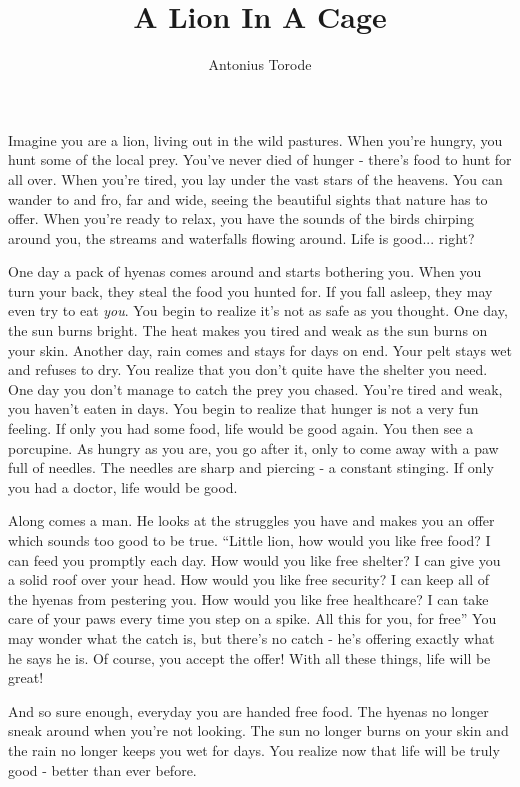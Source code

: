 \documentclass[10pt]{article}
\title{A Lion In A Cage}
\author{Antonius Torode}
\begin{document}
\maketitle
\thispagestyle{fancy}

\begin{multicols}{2}

Imagine you are a lion, living out in the wild pastures. When you're hungry, you hunt some of the local prey. You've never died of hunger - there's food to hunt for all over. When you're tired, you lay under the vast stars of the heavens. You can wander to and fro, far and wide, seeing the beautiful sights that nature has to offer. When you're ready to relax, you have the sounds of the birds chirping around you, the streams and waterfalls flowing around. Life is good... right?

One day a pack of hyenas comes around and starts bothering you. When you turn your back, they steal the food you hunted for. If you fall asleep, they may even try to eat \textit{you}. You begin to realize it's not as safe as you thought. One day, the sun burns bright. The heat makes you tired and weak as the sun burns on your skin. Another day, rain comes and stays for days on end. Your pelt stays wet and refuses to dry. You realize that you don't quite have the shelter you need. One day you don't manage to catch the prey you chased. You're tired and weak, you haven't eaten in days. You begin to realize that hunger is not a very fun feeling. If only you had some food, life would be good again. You then see a porcupine. As hungry as you are, you go after it, only to come away with a paw full of needles. The needles are sharp and piercing - a constant stinging. If only you had a doctor, life would be good.

Along comes a man. He looks at the struggles you have and makes you an offer which sounds too good to be true. ``Little lion, how would you like free food? I can feed you promptly each day. How would you like free shelter? I can give you a solid roof over your head. How would you like free security? I can keep all of the hyenas from pestering you. How would you like free healthcare? I can take care of your paws every time you step on a spike. All this for you, for free'' You may wonder what the catch is, but there's no catch - he's offering exactly what he says he is. Of course, you accept the offer! With all these things, life will be great!

And so sure enough, everyday you are handed free food. The hyenas no longer sneak around when you're not looking. The sun no longer burns on your skin and the rain no longer keeps you wet for days. You realize now that life will be truly good - better than ever before.


\end{multicols}
\end{document}
